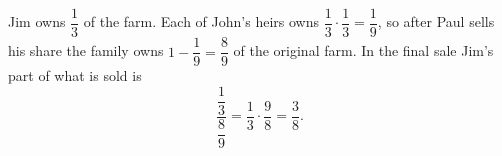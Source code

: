Jim owns $\dfrac{1}{3}$ of the farm. Each of John's heirs owns $\dfrac{1}{3}\cdot\dfrac{1}{3}=\dfrac{1}{9}$, so after Paul sells his share the family owns $1-\dfrac{1}{9}=\dfrac{8}{9}$ of the original farm. In the final sale Jim's part of what is sold is
\[
\dfrac{\dfrac{1}{3}}{\dfrac{8}{9}}=\dfrac{1}{3}\cdot\dfrac{9}{8}=\boxed{\dfrac{3}{8}}.
\]
